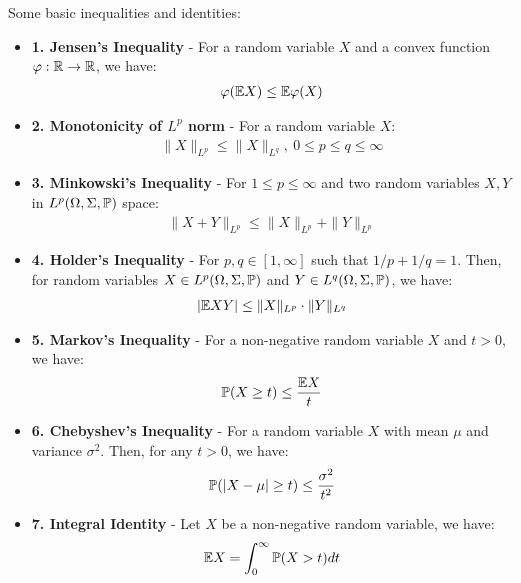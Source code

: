 \noindent Some basic inequalities and identities:
\begin{itemize}
    \item \textbf{1. Jensen's Inequality} - For a random variable $X$ and a convex function $\varphi:\mathbb{R}\to\mathbb{R}$, we have:
    \begin{align}
        \varphi(\mathbb{E} X) \le \mathbb{E}\varphi(X)
    \end{align}

    \item \textbf{2. Monotonicity of $L^p$ norm} - For a random variable $X$:
    \begin{align}
        \|X\|_{L^p} \le \|X\|_{L^q}, \ 0 \le p\le q \le \infty
    \end{align}

    \item \textbf{3. Minkowski's Inequality} - For $1\le p \le \infty$ and two random variables $X, Y$ in $L^p(\Omega, \Sigma, \mathbb{P})$ space:
    \begin{align}
        \|X+Y\|_{L^p} \le \|X\|_{L^p} + \|Y\|_{L^p}
    \end{align}

    \item \textbf{4. Holder's Inequality} - For $p, q\in [1, \infty]$ such that $1/p + 1/q=1$. Then, for random variables $X\in L^p(\Omega, \Sigma, \mathbb{P})$ and $Y\in L^q(\Omega, \Sigma, \mathbb{P})$, we have:
    \begin{align}
        |\mathbb{E} XY| \le \|X\|_{L^p}\cdot\|Y\|_{L^q} 
    \end{align}
    
    \item \textbf{5. Markov's Inequality} - For a non-negative random variable $X$ and $t>0$, we have:
    \begin{align}
        \mathbb{P}(X \ge t ) \le \frac{\mathbb{E} X}{t}
    \end{align}

    \item \textbf{6. Chebyshev's Inequality} - For a random variable $X$ with mean $\mu$ and variance $\sigma^2$. Then, for any $t>0$, we have:
    \begin{align}
        \mathbb{P}(|X-\mu| \ge t) \le \frac{\sigma^2}{t^2}
    \end{align}

    \item \textbf{7. Integral Identity} - Let $X$ be a non-negative random variable, we have:
    \begin{align}
        \mathbb{E} X = \int_0^\infty \mathbb{P}(X > t)dt
    \end{align}
\end{itemize}

